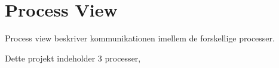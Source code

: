 \documentclass[Main]{subfiles}
\begin{document}
\section{Process View}
Process view beskriver kommunikationen imellem de forskellige processer.

Dette projekt indeholder 3 processer, 
\end{document}
